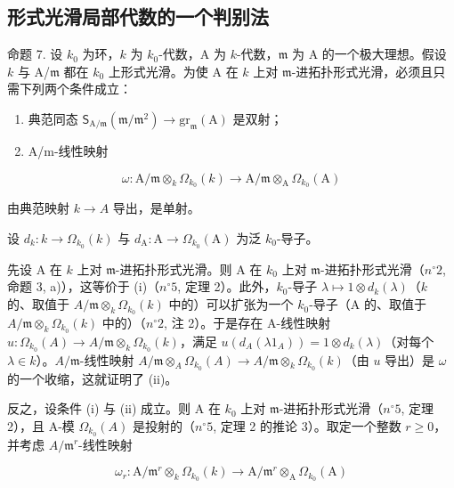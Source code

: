 \subsection{形式光滑局部代数的一个判别法}

命题 7. 设 \(k_{0}\) 为环，\(k\) 为 \(k_{0}\)-代数，A 为 \(k\)-代数，\(\mathfrak{m}\) 为 A 的一个极大理想。假设 \(k\) 与 A/\(\mathfrak{m}\) 都在 \(k_{0}\) 上形式光滑。为使 A 在 \(k\) 上对 \(\mathfrak{m}\)-进拓扑形式光滑，必须且只需下列两个条件成立：

\begin{enumerate}
\def\labelenumi{(\roman{enumi})}
\item
  典范同态 \(\mathsf{S}_{\mathrm{A} / \mathfrak{m}}(\mathfrak{m} / \mathfrak{m}^{2})\to \mathrm{gr}_{\mathfrak{m}}(\mathrm{A})\) 是双射；
\item
  A/m-线性映射
\end{enumerate}

\[
\omega : \mathrm{A} / \mathfrak {m} \otimes_ {k} \Omega_ {k _ {0}} (k) \longrightarrow \mathrm{A} / \mathfrak {m} \otimes_ {\mathrm{A}} \Omega_ {k _ {0}} (\mathrm{A})
\]

由典范映射 \(k \to A\) 导出，是单射。

设 \(d_{k}:k\to \Omega_{k_{0}}(k)\) 与 \(d_{\mathrm{A}}:\mathrm{A}\to \Omega_{k_0}(\mathrm{A})\) 为泛 \(k_{0}\)-导子。

先设 A 在 \(k\) 上对 \(\mathfrak{m}\)-进拓扑形式光滑。则 A 在 \(k_{0}\) 上对 \(\mathfrak{m}\)-进拓扑形式光滑（\(n^{\circ} 2\), 命题 3, a)），这等价于 (i)（\(n^{\circ} 5\), 定理 2）。此外，\(k_{0}\)-导子 \(\lambda \mapsto 1 \otimes d_{k}(\lambda)\)（\(k\) 的、取值于 \(A/\mathfrak{m} \otimes_{k} \Omega_{k_{0}}(k)\) 中的）可以扩张为一个 \(k_{0}\)-导子（A 的、取值于 \(A/\mathfrak{m} \otimes_{k} \Omega_{k_{0}}(k)\) 中的）（\(n^{\circ} 2\), 注 2）。于是存在 A-线性映射 \(u: \Omega_{k_{0}}(A) \to A/\mathfrak{m} \otimes_{k} \Omega_{k_{0}}(k)\)，满足 \(u(d_{A}(\lambda 1_{A})) = 1 \otimes d_{k}(\lambda)\)（对每个 \(\lambda \in k\)）。\(A/\mathfrak{m}\)-线性映射 \(A/\mathfrak{m} \otimes_{A} \Omega_{k_{0}}(A) \longrightarrow A/\mathfrak{m} \otimes_{k} \Omega_{k_{0}}(k)\)（由 \(u\) 导出）是 \(\omega\) 的一个收缩，这就证明了 (ii)。

反之，设条件 (i) 与 (ii) 成立。则 A 在 \(k_{0}\) 上对 \(\mathfrak{m}\)-进拓扑形式光滑（\(n^{\circ}5\), 定理 2），且 A-模 \(\Omega_{k_{0}}(A)\) 是投射的（\(n^{\circ}5\), 定理 2 的推论 3）。取定一个整数 \(r \geqslant 0\)，并考虑 \(A/\mathfrak{m}^{r}\)-线性映射

\[
\omega_ {r}: \mathrm{A} / \mathfrak {m} ^ {r} \otimes_ {k} \Omega_ {k _ {0}} (k) \longrightarrow \mathrm{A} / \mathfrak {m} ^ {r} \otimes_ {\mathrm{A}} \Omega_ {k _ {0}} (\mathrm{A})
\]

